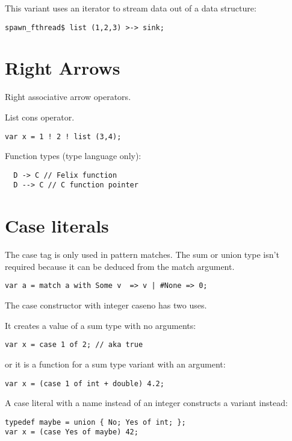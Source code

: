\documentclass[oneside]{book}
\begin{document}
{This variant uses an iterator to stream data out of a data structure:

\begin{verbatim}
spawn_fthread$ list (1,2,3) >-> sink;
\end{verbatim}


\section{Right Arrows}
Right associative arrow operators.

List cons operator.

\begin{verbatim}
var x = 1 ! 2 ! list (3,4);
\end{verbatim}


Function types (type language only):

\begin{verbatim}
  D -> C // Felix function
  D --> C // C function pointer
\end{verbatim}


\section{Case literals}

The case tag is only used in pattern matches.
The sum or union type isn't required because it can be deduced
from the match argument.

\begin{verbatim}
var a = match a with Some v  => v | #None => 0;
\end{verbatim}


The case constructor with integer caseno has two uses. 

It creates a value of
a sum type with no arguments:

\begin{verbatim}
var x = case 1 of 2; // aka true
\end{verbatim}

or it is a function for a sum type variant with an argument:

\begin{verbatim}
var x = (case 1 of int + double) 4.2;
\end{verbatim}


A case literal with a name instead of an integer constructs
a variant instead:

\begin{verbatim}
typedef maybe = union { No; Yes of int; };
var x = (case Yes of maybe) 42;
\end{verbatim}


}
\end{document}
